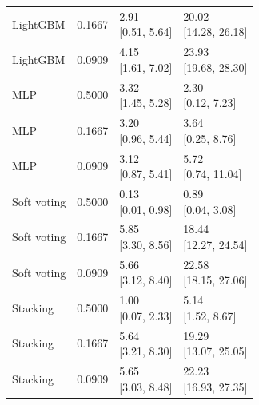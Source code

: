 \begin{longtable}{llll}
LightGBM & 0.1667 & \shortstack{{2.91} \\ {[0.51, 5.64]}} & \shortstack{{20.02} \\ {[14.28, 26.18]}} \\
LightGBM & 0.0909 & \shortstack{{4.15} \\ {[1.61, 7.02]}} & \shortstack{{23.93} \\ {[19.68, 28.30]}} \\
MLP & 0.5000 & \shortstack{{3.32} \\ {[1.45, 5.28]}} & \shortstack{{2.30} \\ {[0.12, 7.23]}} \\
MLP & 0.1667 & \shortstack{{3.20} \\ {[0.96, 5.44]}} & \shortstack{{3.64} \\ {[0.25, 8.76]}} \\
MLP & 0.0909 & \shortstack{{3.12} \\ {[0.87, 5.41]}} & \shortstack{{5.72} \\ {[0.74, 11.04]}} \\
Soft voting & 0.5000 & \shortstack{{0.13} \\ {[0.01, 0.98]}} & \shortstack{{0.89} \\ {[0.04, 3.08]}} \\
Soft voting & 0.1667 & \shortstack{{5.85} \\ {[3.30, 8.56]}} & \shortstack{{18.44} \\ {[12.27, 24.54]}} \\
Soft voting & 0.0909 & \shortstack{{5.66} \\ {[3.12, 8.40]}} & \shortstack{{22.58} \\ {[18.15, 27.06]}} \\
Stacking & 0.5000 & \shortstack{{1.00} \\ {[0.07, 2.33]}} & \shortstack{{5.14} \\ {[1.52, 8.67]}} \\
Stacking & 0.1667 & \shortstack{{5.64} \\ {[3.21, 8.30]}} & \shortstack{{19.29} \\ {[13.07, 25.05]}} \\
Stacking & 0.0909 & \shortstack{{5.65} \\ {[3.03, 8.48]}} & \shortstack{{22.23} \\ {[16.93, 27.35]}} \\
\bottomrule
\end{longtable}
\endgroup
